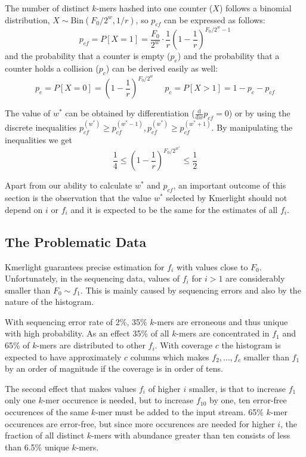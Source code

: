 The number of distinct $k$-mers hashed into one counter ($X$) follows a binomial distribution, $X \sim \mathrm{Bin}(F_0/2^w, 1/r)$, so $p_{cf}$ can be expressed as follows:
\begin{equation} \label{eq:pcf}
p_{cf} = P[X=1] = \frac{F_0}{2^w} \cdot \frac{1}{r} \left(1 - \frac{1}{r}\right)^{F_0/2^w - 1}
\end{equation}
and the probability that a counter is empty ($p_e$) and the probability that a counter holds a collision ($p_c$) can be derived easily as well:
$$p_e = P[X=0] = \left(1 - \frac{1}{r}\right)^{F_0/2^w} ~~~~~~ p_c = P[X>1] = 1 - p_e - p_{cf}$$

The value of $w^*$ can be obtained by differentiation ($\frac{\mathrm{d}}{\mathrm{d}w}p_{cf} = 0$) or by using the discrete inequalities 
$p_{cf}^{(w^*)} \geq p_{cf}^{(w^*-1)}, p_{cf}^{(w^*)} \geq p_{cf}^{(w^*+1)}$. 
By manipulating the inequalities we get
\begin{equation} \label{eq:wstarbounds}
\frac{1}{4} \leq \left(1 - \frac{1}{r}\right)^{F_0/2^{w^*}} \leq \frac{1}{2}
\end{equation}

\medskip

Apart from our ability to calculate $w^*$ and $p_{cf}$, an important outcome of
this section is the observation that the value $w^*$ selected by Kmerlight should not
depend on $i$ or $f_i$ and it is expected to be the same for the estimates of all $f_i$.

\subsection{The Problematic Data}
Kmerlight guarantees precise estimation for $f_i$ with values close to $F_0$.
Unfortunately, in the sequencing data, values of $f_i$ for $i > 1$ are considerably 
smaller than $F_0 \sim f_1$. This is mainly caused by sequencing errors and also
by the nature of the histogram.

With sequencing error rate of 2\%, 35\% $k$-mers are erroneous and thus unique with high probability.
As an effect 35\% of all $k$-mers are concentrated in $f_1$ and 65\% of $k$-mers are
distributed to other $f_i$. With coverage $c$ the histogram is expected to have 
approximately $c$ columns which makes $f_2, \dots, f_c$ smaller than $f_1$ by an order of magnitude if the coverage is in order of tens.

The second effect that makes values $f_i$ of higher $i$ smaller, is that
to increase $f_1$ only one $k$-mer occurence is needed, but to increase $f_{10}$ by one, 
ten error-free occurences of the same $k$-mer must be added to the input stream. 
65\% $k$-mer occurences are error-free, but since more occurences are needed for higher $i$,
the fraction of all distinct $k$-mers with abundance greater than ten consists of less than 
6.5\% unique $k$-mers.

